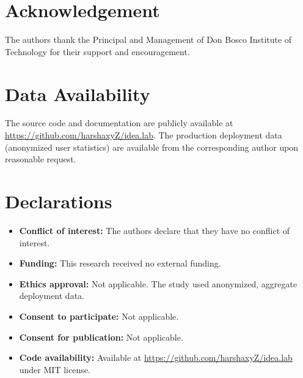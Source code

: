 \documentclass[11pt,a4paper]{article}
\theoremstyle{plain}
\theoremstyle{definition}
\begin{document}

\section*{Acknowledgement}

The authors thank the Principal and Management of Don Bosco Institute of Technology for their support and encouragement.

\section*{Data Availability}

The source code and documentation are publicly available at \url{https://github.com/harshaxyZ/idea.lab}. The production deployment data (anonymized user statistics) are available from the corresponding author upon reasonable request.

\section*{Declarations}

\begin{itemize}[noitemsep,topsep=3pt]
    \item \textbf{Conflict of interest:} The authors declare that they have no conflict of interest.
    \item \textbf{Funding:} This research received no external funding.
    \item \textbf{Ethics approval:} Not applicable. The study used anonymized, aggregate deployment data.
    \item \textbf{Consent to participate:} Not applicable.
    \item \textbf{Consent for publication:} Not applicable.
    \item \textbf{Code availability:} Available at \url{https://github.com/harshaxyZ/idea.lab} under MIT license.
\end{itemize}



\end{document}
